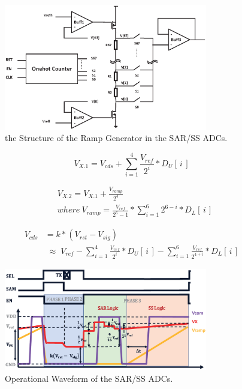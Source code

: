 \documentclass[conference]{IEEEtran}
\begin{document}
\begin{figure}[htbp] 
	\centerline{\includegraphics[width=3.5in]{./Figures/RRAMP.eps}}
	\caption{the Structure of the Ramp Generator in the SAR/SS ADCs.}
	\label{RRAMP}
\end{figure} 

\begin{equation}
	V_{X.1}=V_{cds}+\sum_{i=1}^{4} {\frac{V_{ref}}{2^{i}}\ast{D_{U}\left[\,i\,\right]}}
	\label{eq4}
\end{equation}

\begin{equation}
	\begin{aligned}
	&V_{X.2}=V_{X.1}+\frac{V_{ramp}}{2^4}\\ &where\  V_{ramp}=\frac{V_{ref}}{2^6-1}\ast\sum_{i=1}^{6}2^{6-i}\ast{D_{L}\left[\,i\,\right]}
	\label{eq5}
	\end{aligned}	
\end{equation}

\begin{equation}
	\begin{aligned}
	V_{cds}&=k\ast(V_{rst}-V_{sig})\\
	&\;{\approx}\;{V_{ref}-\sum_{i=1}^{4} \frac{V_{ref}}{2^{i}}\ast{D_{U}\left[\,i\,\right]}-\sum_{i=1}^{6} \frac{V_{ref}}{2^{4+i}}\ast{D_{L}\left[\,i\,\right]}}
	\label{eq6}
	\end{aligned}
\end{equation}

\begin{figure}[htbp]
	\centerline{\includegraphics[width=3.5in]{./Figures/SARWAVE.eps}}
	\caption{Operational Waveform of the SAR/SS ADCs.}
	\label{SARWAVE}
\end{figure} 
\end{document}
